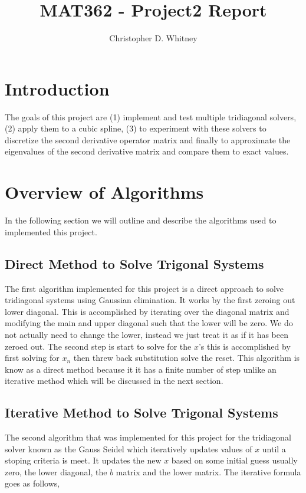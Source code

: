 \documentclass{article}
\begin{document}
\title{MAT362 - Project2 Report}
\author{Christopher D. Whitney}

\maketitle

\section*{Introduction}
The goals of this project are (1) implement and test multiple tridiagonal solvers, (2) apply them to a cubic spline, (3) to experiment with these solvers to discretize the second derivative operator matrix and finally to approximate the eigenvalues of the second derivative matrix and compare them to exact values. 

\section*{Overview of Algorithms}
In the following section we will outline and describe the algorithms used to implemented this project. 

\subsection*{Direct Method to Solve Trigonal Systems}
The first algorithm implemented for this project is a direct approach to solve tridiagonal systems using Gaussian elimination. It works by the first zeroing out lower diagonal. This is accomplished by iterating over the diagonal matrix and modifying the main and upper diagonal such that the lower will be zero. We do not actually need to change the lower, instead we just treat it as if it has been zeroed out. The second step is start to solve for the $x$'s this is accomplished by first solving for $x_n$ then threw back substitution solve the reset. This algorithm is know as a direct method because it it has a finite number of step unlike an iterative method which will be discussed in the next section. 

\subsection*{Iterative Method to Solve Trigonal Systems}
The second algorithm that was implemented for this project for the tridiagonal solver known as the Gauss Seidel which iteratively updates values of $x$ until a stoping criteria is meet. It updates the new $x$ based on some initial guess usually zero, the lower diagonal, the $b$ matrix and the lower matrix. The iterative formula goes as follows, 
\end{document}
